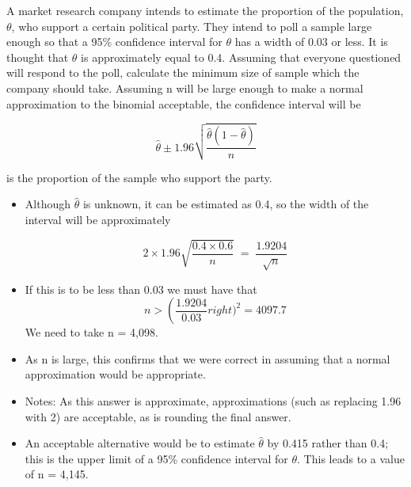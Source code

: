 \newpage

\large 

A market research company intends to estimate the proportion of the population, $\theta$, who support a certain political party. They intend to poll a sample large enough so that a 95\% confidence interval for $\theta$ has a width of 0.03 or less. It is thought that $\theta$ is approximately equal to 0.4.
Assuming that everyone questioned will respond to the poll, calculate the minimum size of sample which the company should take. 
 Assuming n will be large enough to make a normal approximation to the
binomial acceptable, the confidence interval will be

\[ \hat{\theta} \pm 1.96  \sqrt{ \frac{\hat{\theta}(1-\hat{\theta})}{n} } \]
 

is the proportion of the sample who support the party.
\begin{itemize}
\item Although $\hat{\theta}$ is unknown, it can be estimated as 0.4, so the width of the interval will be approximately

\[ 2 \times 1.96  \sqrt{ \frac{0.4 \times 0.6 }{n} } \;=\; \frac{1.9204}{\sqrt{n}}\]


\item If this is to be less than 0.03 we must have that
\[ n > \left(  \frac{1.9204}{0.03}   right)^2  = 4097.7\]
We need to take n = 4,098.
\item As n is large, this confirms that we were correct in assuming that a normal
approximation would be appropriate.
\item Notes: As this answer is approximate, approximations (such as replacing 1.96
with 2) are acceptable, as is rounding the final answer.
\item An acceptable alternative would be to estimate $\hat{\theta}$ by 0.415 rather than 0.4; this
is the upper limit of a 95\% confidence interval for $\theta$. This leads to a value of
n = 4,145.
\end{itemize}



